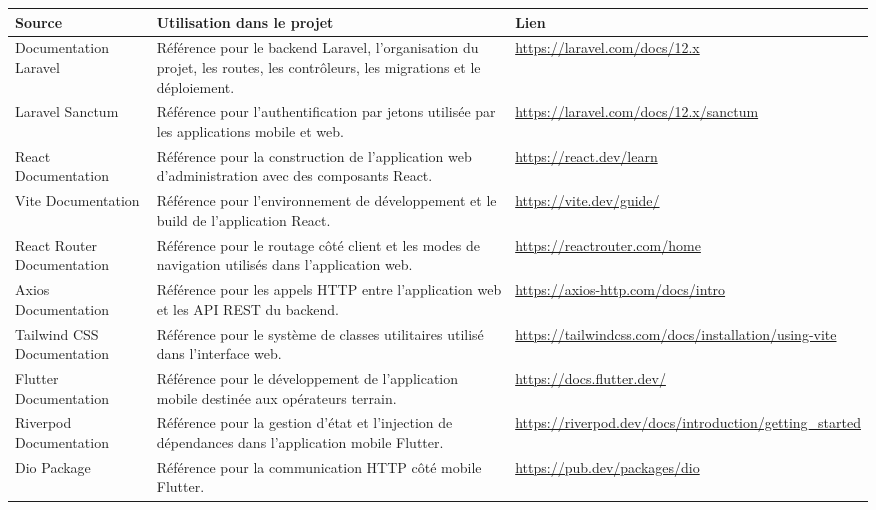 \small
\begin{longtable}{|p{4cm}|p{7.1cm}|p{3.2cm}|}
\hline
\textbf{Source} & \textbf{Utilisation dans le projet} & \textbf{Lien} \\
\hline
\endhead

Documentation Laravel & Référence pour le backend Laravel, l'organisation du projet, les routes, les contrôleurs, les migrations et le déploiement. & \url{https://laravel.com/docs/12.x} \\
\hline

Laravel Sanctum & Référence pour l'authentification par jetons utilisée par les applications mobile et web. & \url{https://laravel.com/docs/12.x/sanctum} \\
\hline

React Documentation & Référence pour la construction de l'application web d'administration avec des composants React. & \url{https://react.dev/learn} \\
\hline

Vite Documentation & Référence pour l'environnement de développement et le build de l'application React. & \url{https://vite.dev/guide/} \\
\hline

React Router Documentation & Référence pour le routage côté client et les modes de navigation utilisés dans l'application web. & \url{https://reactrouter.com/home} \\
\hline

Axios Documentation & Référence pour les appels HTTP entre l'application web et les API REST du backend. & \url{https://axios-http.com/docs/intro} \\
\hline

Tailwind CSS Documentation & Référence pour le système de classes utilitaires utilisé dans l'interface web. & \url{https://tailwindcss.com/docs/installation/using-vite} \\
\hline

Flutter Documentation & Référence pour le développement de l'application mobile destinée aux opérateurs terrain. & \url{https://docs.flutter.dev/} \\
\hline

Riverpod Documentation & Référence pour la gestion d'état et l'injection de dépendances dans l'application mobile Flutter. & \url{https://riverpod.dev/docs/introduction/getting_started} \\
\hline

Dio Package & Référence pour la communication HTTP côté mobile Flutter. & \url{https://pub.dev/packages/dio} \\
\hline


\end{longtable}
